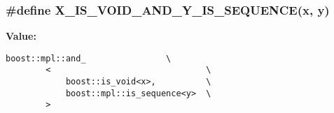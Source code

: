 \subsubsection{\setlength{\rightskip}{0pt plus 5cm}\#define X\_\-IS\_\-VOID\_\-AND\_\-Y\_\-IS\_\-SEQUENCE(x, y)}\label{_call_scheduler_8h_c7a66ee34f86eb0603031f1bc49e5542}


\textbf{Value:}

\begin{Code}\begin{verbatim}boost::mpl::and_                \
        <                               \
            boost::is_void<x>,          \
            boost::mpl::is_sequence<y>  \
        >
\end{verbatim}\end{Code}
